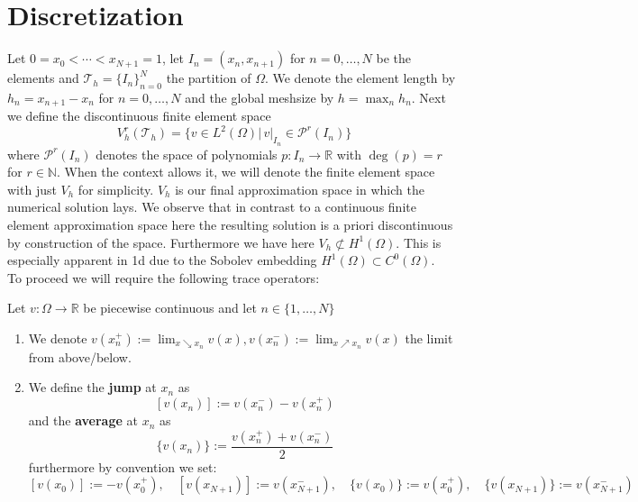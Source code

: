 \section{Discretization}
Let $0=x_0 < \cdots < x_{N+1} = 1$, let $I_n = (x_n, x_{n+1})$ for $n = 0,\ldots,N$ be the elements and $\mathcal{T}_h = \{I_n\}_{n=0}^N$ the partition
of $\Omega$.
We denote the element length by $h_n = x_{n+1} - x_{n}$ for $n=0,\ldots,N$ and the global meshsize by
$h = \max_{n} h_n$.
Next we define the discontinuous finite element space
\begin{equation}
    V_h^r(\mathcal{T}_h) = \{v \in L^2(\Omega) |\, v|_{I_n} \in \mathcal{P}^r(I_n) \} 
\end{equation}
where $\mathcal{P}^r(I_n)$ denotes the space of polynomials $p:I_n \to \mathbb{R}$ with $\deg(p) = r$
for $r \in \mathbb{N}$. When the context allows it, we will denote the
finite element space with just $V_h$ for simplicity. 
$V_h$ is our final approximation space in which the numerical solution
lays.
We observe that in contrast to a continuous finite element approximation space 
here the resulting solution is a priori discontinuous by construction 
of the space. Furthermore we have here $V_h \not\subset H^1(\Omega)$.
This is especially apparent in 1d due to the Sobolev embedding $H^1(\Omega) \subset C^0(\Omega)$. \\
To proceed we will require the following trace operators:

\begin{definition} 
    Let $v:\Omega \to \mathbb{R}$ be piecewise continuous and let $n \in
    \{1,\ldots,N\}$
    \begin{enumerate}[label=\textnormal{(\roman*)}]
        \item We denote $v(x_n^+) := \lim_{x \searrow x_n} v(x), v(x_n^-) := \lim_{x \nearrow x_n} v(x)$
        the limit from above/below.
        \item We define the \textbf{jump} at $x_n$ as
        \[
        [v(x_n)]:= v(x_n^-) - v(x_n^+)
        \]
        and the \textbf{average} at $x_n$ as
        \[
            \{v(x_n)\}:= \frac{v(x_n^+) + v(x_n^-)}{2}
        \]
        furthermore by convention we set: 
        \[
            [v(x_0)] := -v(x_0^+),\quad [v(x_{N+1})] := v(x_{N+1}^-),\quad 
            \{v(x_0)\}:=v(x_0^+),\quad \{v(x_{N+1})\}:= v(x_{N+1}^-)
        \]  
    \end{enumerate}
\end{definition}

